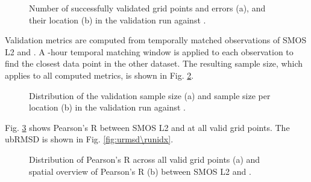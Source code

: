 \begin{figure}[ht!]
\centering
\begin{minipage}[c]{0.34\textwidth}
    \centering
    \subcaption{} %
\end{minipage}%
\hfill
\begin{minipage}[c]{0.64\textwidth}
    \centering
    \subcaption{} %
\end{minipage}
\caption{Number of successfully validated grid points and errors (a), and their location (b) in the validation run against \runrefname.}
\label{fig:status\runidx}
\end{figure}

\noindent Validation metrics are computed from temporally matched observations of \ac{SMOS} \ac{L2} and \runrefname.
A -hour temporal matching window is applied to each  observation to find the closest data point in the other dataset.
The resulting sample size, which applies to all computed metrics, is shown in Fig. \ref{fig:nobs\runidx}.

\begin{figure}[ht!]
\centering
\begin{minipage}[c]{0.34\textwidth}
    \centering
    \subcaption{} %
\end{minipage}%
\hfill
\begin{minipage}[c]{0.64\textwidth}
    \centering
    \subcaption{} %
\end{minipage}
\caption{Distribution of the validation sample size (a) and sample size per location (b) in the validation run against \runrefname.}
\label{fig:nobs\runidx}
\end{figure}

\noindent Fig. \ref{fig:Rbox\runidx} shows Pearson's R between \ac{SMOS} \ac{L2} and \runrefname{} at all valid grid points.
The \ac{ubRMSD} is shown in Fig. \ref{fig:urmsd\runidx}.

\begin{figure}[ht!]
\centering
\begin{minipage}[c]{0.34\textwidth}
    \centering
    \subcaption{} %
\end{minipage}%
\hfill
\begin{minipage}[c]{0.64\textwidth}
    \centering
    \subcaption{} %
\end{minipage}
\caption{Distribution of Pearson's R across all valid grid points (a) and spatial overview of Pearson's R (b) between \ac{SMOS} \ac{L2} and \runrefname.}
\label{fig:Rbox\runidx}
\end{figure}

